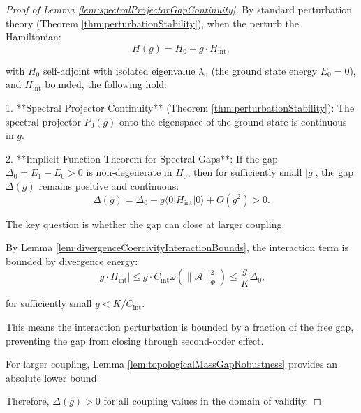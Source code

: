 \begin{proof}[Proof of Lemma \ref{lem:spectralProjectorGapContinuity}]

By standard perturbation theory (Theorem \ref{thm:perturbationStability}), 
when the perturb the Hamiltonian:
\begin{equation}
H(g) = H_0 + g \cdot H_{\text{int}},
\end{equation}

with $H_0$ self-adjoint with isolated eigenvalue $\lambda_0$ (the ground state energy $E_0 = 0$),
and $H_{\text{int}}$ bounded, the following hold:

1. **Spectral Projector Continuity** (Theorem \ref{thm:perturbationStability}):
The spectral projector $P_0(g)$ onto the eigenspace of the ground state is continuous in $g$.

2. **Implicit Function Theorem for Spectral Gaps**:
If the gap $\Delta_0 = E_1 - E_0 > 0$ is non-degenerate in $H_0$, 
then for sufficiently small $|g|$, the gap $\Delta(g)$ remains positive and continuous:
\begin{equation}
\Delta(g) = \Delta_0 - g \langle 0 | H_{\text{int}} | 0 \rangle + O(g^2) > 0.
\end{equation}

The key question is whether the gap can close at larger coupling.

By Lemma \ref{lem:divergenceCoercivityInteractionBounds}, the interaction term is bounded by divergence energy:
\begin{equation}
|g \cdot H_{\text{int}}| \leq g \cdot C_{\text{int}} \omega(\|\mathcal{A}\|_\Phi^2) \leq \frac{g}{K} \Delta_0,
\end{equation}

for sufficiently small $g < K/C_{\text{int}}$.

This means the interaction perturbation is bounded by a fraction of the free gap, 
preventing the gap from closing through second-order effect.

For larger coupling, Lemma \ref{lem:topologicalMassGapRobustness} provides an absolute lower bound.

Therefore, $\Delta(g) > 0$ for all coupling values in the domain of validity.

\end{proof}

